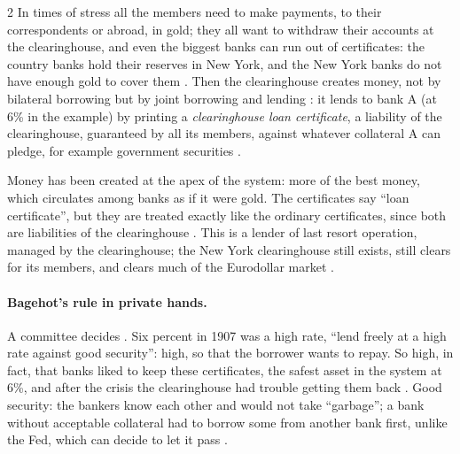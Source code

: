 \begin{paracol}{2}
In times of stress all the members need to make payments, to their correspondents or abroad, in gold; they all want to withdraw their accounts at
the clearinghouse, and even the biggest banks can run out of certificates: the country banks hold their reserves in New York, and the New York banks
do not have enough gold to cover them . Then the clearinghouse creates money, not by bilateral borrowing but
by joint borrowing and lending : it lends to bank A (at 6\% in the example) by printing a \emph{clearinghouse loan
certificate}, a liability of the clearinghouse, guaranteed by all its members, against whatever collateral A can pledge, for example government
securities .
\begin{taccts}
\qquad
{}
\end{taccts}
Money has been created at the apex of the system: more of the best money, which circulates among banks as if it were gold. The certificates say
``loan certificate'', but they are treated exactly like the ordinary certificates, since both are liabilities of the clearinghouse
. This is a lender of last resort operation, managed by the clearinghouse; the New York
clearinghouse still exists, still clears for its members, and clears much of the Eurodollar market .

\paragraph{Bagehot's rule in private hands.} A committee decides . Six percent in 1907 was a high rate, ``lend freely at a high rate
against good security'': high, so that the borrower wants to repay. So high, in fact, that banks liked to keep these certificates, the safest asset in
the system at 6\%, and after the crisis the clearinghouse had trouble getting them back . Good security: the
bankers know each other and would not take ``garbage''; a bank without acceptable collateral had to borrow some from another bank first, unlike the Fed,
which can decide to let it pass .


\end{paracol}
